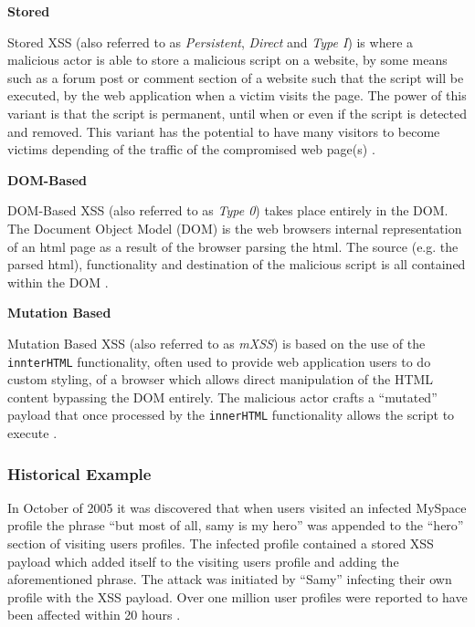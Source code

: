 \documentclass{mscreport}
\begin{document}
\vspace{0.6cm} \noindent
\textbf{Stored}

\vspace{0.2cm} \noindent
Stored XSS (also referred to as \textit{Persistent}, \textit{Direct} and \textit{Type I}) is where a malicious actor is able to store a malicious script on a website, by some means such as a forum post or comment section of a website such that the script will be executed, by the web application when a victim visits the page. The power of this variant is that the script is permanent, until when or even if the script is detected and removed. This variant has the potential to have many visitors to become victims depending of the traffic of the compromised web page(s) \cite{Rodriguez2020-bg}.

\vspace{0.6cm} \noindent
\textbf{DOM-Based}

\vspace{0.2cm} \noindent
DOM-Based XSS (also referred to as \textit{Type 0}) takes place entirely in the DOM. The Document Object Model (DOM) is the web browsers internal representation of an html page as a result of the browser parsing the html. The source (e.g. the parsed html), functionality and destination of the malicious script is all contained within the DOM \cite{Rodriguez2020-bg,Klein2005-hx}.

\vspace{0.6cm} \noindent
\textbf{Mutation Based}

\vspace{0.2cm} \noindent
Mutation Based XSS (also referred to as \textit{mXSS}) is based on the use of the \texttt{innterHTML} functionality, often used to provide web application users to do custom styling, of a browser which allows direct manipulation of the HTML content bypassing the DOM entirely. The malicious actor crafts a ``mutated'' payload that once processed by the \texttt{innerHTML} functionality allows the script to execute \cite{Heiderich2013-qv}.

\subsubsection{Historical Example}
In October of 2005 it was discovered that when users visited an infected MySpace profile the phrase ``but most of all, samy is my hero'' was appended to the ``hero'' section of visiting users profiles. The infected profile contained a stored XSS payload which added itself to the visiting users profile and adding the aforementioned phrase. The attack was initiated by ``Samy'' infecting their own profile with the XSS payload. Over one million user profiles were reported to have been affected within 20 hours \cite{Lee2019-xf}.
\end{document}
